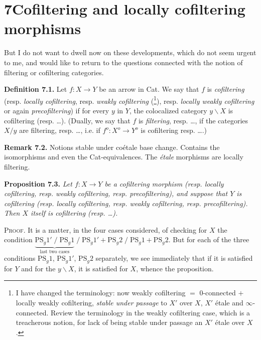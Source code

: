 
\section*{7\quad Cofiltering and locally cofiltering morphisms}

But I do not want to dwell now on these developments, which do not seem urgent to me, and would like to return to the questions connected with the notion of filtering or cofiltering categories.

\textbf{Definition 7.1.} Let $f : X \longrightarrow Y$ be an arrow in Cat. We say that $f$ is \textit{cofiltering} (resp. \textit{locally cofiltering}, resp. \textit{weakly cofiltering} (\footnote[64]{I have changed the terminology: now weakly cofiltering $=$ 0-connected $+$ locally weakly cofiltering, \textit{stable under passage} to $X'$ over $X$, $X'$ étale and $\infty$-connected. Review the terminology in the weakly cofiltering case, which is a treacherous notion, for lack of being stable under passage an $X'$ étale over $X$.}), resp. \textit{locally weakly cofiltering} or again \textit{precofiltering}) if for every $y$ in $Y$, the colocalized category $y\backslash X$ is cofiltering (resp. \dots). (Dually, we say that $f$ is \textit{filtering}, resp. \dots, if the categories $X/y$ are filtering, resp. \dots, i.e. if $f^o : X^o \longrightarrow Y^o$ is cofiltering resp. \dots.) %

\textbf{Remark 7.2.} Notions stable under coétale base change. Contains the isomorphisms and even the Cat-equivalences. The \textit{étale} morphisms are locally filtering.

\textbf{Proposition 7.3.} \textit{Let $f : X \longrightarrow Y$ be a cofiltering morphism (resp. locally cofiltering, resp. weakly cofiltering, resp. precofiltering), and suppose that $Y$ is cofiltering (resp. locally cofiltering, resp. weakly cofiltering, resp. precofiltering). Then $X$ itself is cofiltering (resp. \dots).}

\textsc{Proof}. It is a matter, in the four cases considered, of checking for $X$ the condition $\underbrace{\mathrm{PS}_g1' \;/\; \mathrm{PS}_g1}_{\text{last two cases}} \;/\; \mathrm{PS}_g1' + \mathrm{PS}_g2 \;/\; \mathrm{PS}_g1 + \mathrm{PS}_g2$. But  for each of the three conditions $\mathrm{PS}_g1$, $\mathrm{PS}_g1'$, $\mathrm{PS}_g2$ separately, we see immediately that if it is satisfied for $Y$ and for the $y\backslash X$, it is satisfied for $X$, whence the proposition.


